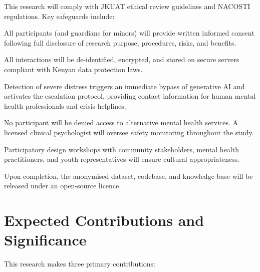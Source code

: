 \documentclass[12pt,a4paper]{article}
\begin{document}
This research will comply with JKUAT ethical review guidelines and NACOSTI regulations. Key safeguards include:

\begin{description}[style=nextline]
  \item[Informed Consent]
  All participants (and guardians for minors) will provide written informed consent following full disclosure of research purpose, procedures, risks, and benefits.

  \item[Data Privacy]
  All interactions will be de-identified, encrypted, and stored on secure servers compliant with Kenyan data protection laws.

  \item[Safety Protocol]
  Detection of severe distress triggers an immediate bypass of generative AI and activates the escalation protocol, providing contact information for human mental health professionals and crisis helplines.

  \item[Participant Welfare]
  No participant will be denied access to alternative mental health services. A licensed clinical psychologist will oversee safety monitoring throughout the study.

  \item[Community Engagement]
  Participatory design workshops with community stakeholders, mental health practitioners, and youth representatives will ensure cultural appropriateness.

  \item[Open-Source Commitment]
  Upon completion, the anonymised dataset, codebase, and knowledge base will be released under an open-source licence.
\end{description}

\section{Expected Contributions and Significance}

This research makes three primary contributions:
\end{document}
